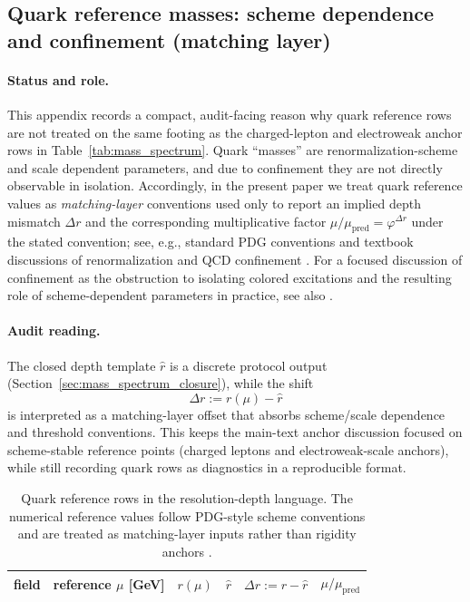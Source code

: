 \subsection{Quark reference masses: scheme dependence and confinement (matching layer)}
\label{app:quark_mass_scheme_notes}

\paragraph{Status and role.}
\MatchTag This appendix records a compact, audit-facing reason why quark reference rows are not treated on the same footing as the charged-lepton and electroweak anchor rows in Table~\ref{tab:mass_spectrum}.
Quark ``masses'' are renormalization-scheme and scale dependent parameters, and due to confinement they are not directly observable in isolation.
Accordingly, in the present paper we treat quark reference values as \emph{matching-layer} conventions used only to report an implied depth mismatch $\Delta r$ and the corresponding multiplicative factor $\mu/\mu_{\mathrm{pred}}=\varphi^{\Delta r}$ under the stated convention; see, e.g., standard PDG conventions \cite{PDGRPP2024} and textbook discussions of renormalization and QCD confinement \cite{PeskinSchroeder1995}.
For a focused discussion of confinement as the obstruction to isolating colored excitations and the resulting role of scheme-dependent parameters in practice, see also \cite{Greensite2011Confinement}.

\paragraph{Audit reading.}
The closed depth template $\widehat r$ is a discrete protocol output (Section~\ref{sec:mass_spectrum_closure}), while the shift
\[
\Delta r:=r(\mu)-\widehat r
\]
is interpreted as a matching-layer offset that absorbs scheme/scale dependence and threshold conventions.
This keeps the main-text anchor discussion focused on scheme-stable reference points (charged leptons and electroweak-scale anchors), while still recording quark rows as diagnostics in a reproducible format.

\begin{table}[t]
\centering
\small
\setlength{\tabcolsep}{6pt}
\renewcommand{\arraystretch}{1.15}
\begin{tabular}{lrrrrr}
\toprule
field & reference $\mu$ [GeV] & $r(\mu)$ & $\widehat r$ & $\Delta r:=r-\widehat r$ & $\mu/\mu_{\mathrm{pred}}$ \\
\midrule

\end{tabular}
\caption{Quark reference rows in the resolution-depth language. The numerical reference values follow PDG-style scheme conventions and are treated as matching-layer inputs rather than rigidity anchors \cite{PDGRPP2024}.}
\label{tab:mass_spectrum_quark_refs}
\end{table}


